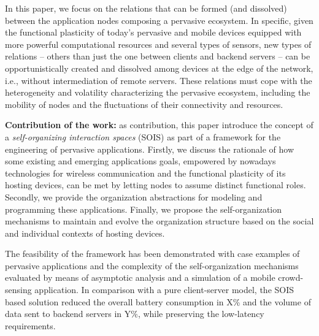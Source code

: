 In this paper, we focus on the relations that can be formed (and dissolved) between the application nodes composing a pervasive ecosystem. In specific, given the functional plasticity of today's pervasive and mobile devices equipped with more powerful computational resources and several types of sensors, 
new types of relations -- others than just the one between clients and backend servers -- can be opportunistically created and dissolved among devices at the edge of the network, i.e., without intermediation of remote servers. These relations must cope with the heterogeneity and volatility characterizing the pervasive ecosystem, including the mobility of nodes and the fluctuations of their connectivity and resources. 


\textbf{Contribution of the work:} 
as contribution, this paper introduce the concept of a \textit{self-organizing interaction spaces} (SOIS) as part of a framework for the engineering of pervasive applications. 
Firstly, we discuss the rationale of how some existing and emerging applications goals, empowered by nowadays technologies for wireless communication and the functional plasticity of its hosting devices, can be met by letting nodes to assume distinct functional roles. 
Secondly, we provide the organization abstractions for modeling and programming these applications. Finally, we propose the self-organization mechanisms to maintain and evolve the organization structure based on the social and individual contexts of hosting devices.

The feasibility of the framework has been demonstrated with case examples of pervasive applications and the complexity of the self-organization mechanisms evaluated by means of asymptotic analysis and a simulation of a mobile crowd-sensing application.
In comparison with a pure client-server model, the SOIS based solution reduced the overall battery consumption in X\% and the volume of data sent to backend servers in Y\%, while preserving the low-latency requirements.


